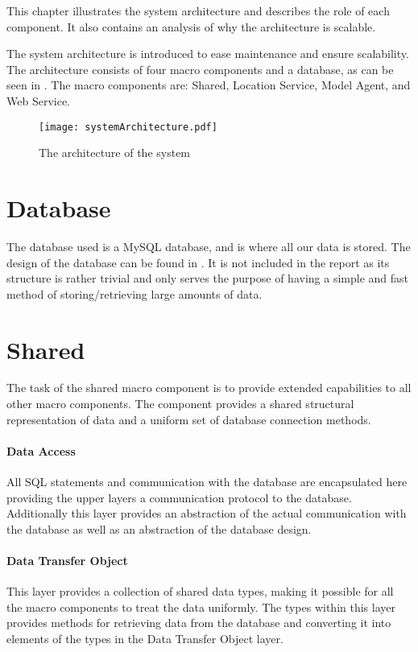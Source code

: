 This chapter illustrates the system architecture and describes the role of each component.
It also contains an analysis of why the architecture is scalable.

The system architecture is introduced to ease maintenance and ensure scalability.
The architecture consists of four macro components and a database, as can be seen in . The macro components are: Shared, Location Service, Model Agent, and Web Service.

\begin{figure}
\texttt{[image: systemArchitecture.pdf]}
\caption{The architecture of the system}
\label{fig:architecture}
\end{figure}

\section{Database} The database used is a MySQL database, and is where all our data is stored.
The design of the database can be found in .
It is not included in the report as its structure is rather trivial and only serves the purpose of having a simple and fast method of storing/retrieving large amounts of data.

\section{Shared}
The task of the shared macro component is to provide extended capabilities to all other macro components.
The component provides a shared structural representation of data and a uniform set of database connection methods.

\paragraph{Data Access} All SQL statements and communication with the database are encapsulated here providing the upper layers a communication protocol to the database.
Additionally this layer provides an abstraction of the actual communication with the database as well as an abstraction of the database design.

\paragraph{Data Transfer Object} This layer provides a collection of shared data types, making it possible for all the macro components to treat the data uniformly.
The types within this layer provides methods for retrieving data from the database and converting it into elements of the types in the Data Transfer Object layer.

